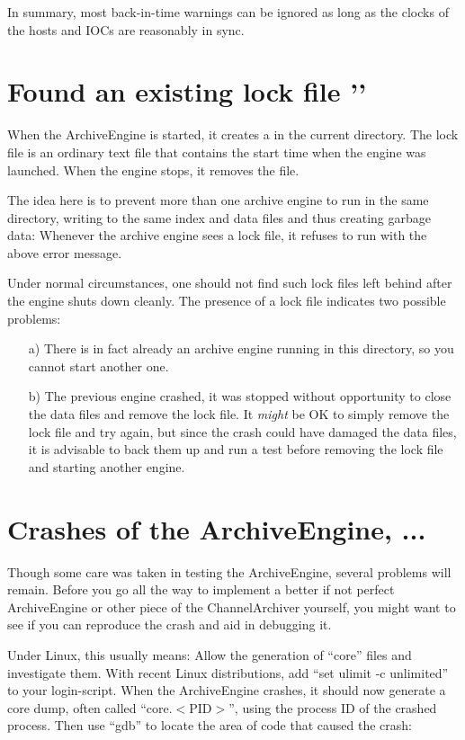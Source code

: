 \noindent In summary, most back-in-time warnings can be ignored as long as the
clocks of the hosts and IOCs are reasonably in sync.

\section{Found an existing lock file ''}
When the ArchiveEngine is started, it creates a  in
the current directory. The lock file is an ordinary text file
that contains the start time when the engine was launched. When
the engine stops, it removes the file.

The idea here is to prevent more than one archive engine to run
in the same directory, writing to the same index and data files
and thus creating garbage data: Whenever the archive engine sees
a lock file, it refuses to run with the above error message.

Under normal circumstances, one should not find such lock files
left behind after the engine shuts down cleanly. The presence of
a lock file indicates two possible problems:
\begin{enumerate}
\item[a)] There is in fact already an archive engine running in
this directory, so you cannot start another one.
\item[b)] The previous engine crashed, it was stopped without
opportunity to close the data files and remove the lock file.
It \emph{might} be OK to simply remove the lock file and try
again, but since the crash could have damaged the data files, it
is advisable to back them up and run a test before removing the
lock file and starting another engine.
\end{enumerate}

\section{Crashes of the ArchiveEngine, ...} \label{sec:crash} 
Though some care was taken in testing the ArchiveEngine, several
problems will remain. Before you go all the way to implement a better
if not perfect ArchiveEngine or other piece of the ChannelArchiver
yourself, you might want to see if you can reproduce the crash and
aid in debugging it.

Under Linux, this usually means: Allow the generation of ``core'' files
and investigate them. With recent Linux distributions, add ``set
ulimit -c unlimited'' to your login-script. When the ArchiveEngine
crashes, it should now generate a core dump, often called
``core.$<$PID$>$'', using the process ID of the crashed process. Then use
``gdb'' to locate the area of code that caused the crash:

